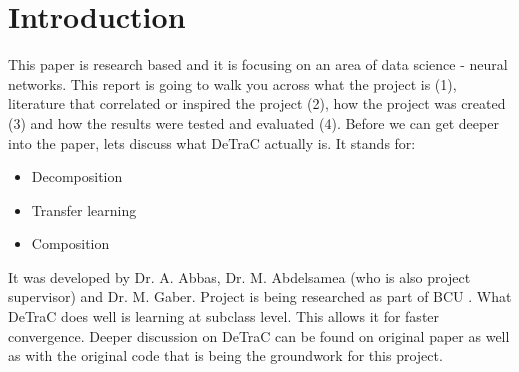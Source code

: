 \section{Introduction} %
This paper is research based and it is focusing on an area of data science - neural networks. This report is going to walk you across what the project is (1), literature that correlated or inspired the project (2), how the project was created (3) and how the results were tested and evaluated (4).
\newline
Before we can get deeper into the paper, lets discuss what DeTraC actually is. It stands for:
\begin{itemize}
  \item Decomposition
  \item Transfer learning
  \item Composition
\end{itemize}
It was developed by Dr. A. Abbas, Dr. M. Abdelsamea (who is also project supervisor) and Dr. M. Gaber. Project is being researched as part of BCU \parencite{DeTraCPapaer}.
What DeTraC does well is learning at subclass level. This allows it for faster convergence. Deeper discussion on DeTraC can be found on original paper as well as with the original code \parencite{web:DeTraCOriginalCode} that is being the groundwork for this project.





%